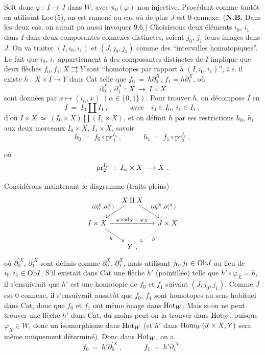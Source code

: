 Soit donc $\varphi\ :\ I\longrightarrow J$ dans $W$, avec $\pi_0(\varphi)$ non injective. Procédant comme tantôt en utilisant Loc\,(5), on est ramené au cas où de plus $J$ est $0$-connexe. (\textbf{N.B.} Dans les deux cas, on aurait pu aussi invoquer 9.6.) Choisissons deux éléments $i_0$, $i_1$ dans $I$ dans deux composantes connexes distinctes, soient $j_0$, $j_1$ leurs images dans $J$. On va traiter $(I,i_0,i_1)$ et $(J,j_0,j_1)$ comme des “intervalles homotopiques”. Le fait que $i_0$, $i_1$ appartiennent à des composantes distinctes de $I$ implique que deux flèches $f_0,f_1 : X\rightrightarrows Y$ sont “homotopes par rapport à $(I,i_0,i_1)$”, \textit{i.e.} il existe $h\ :\ X\times I\longrightarrow Y$ dans Cat telle que $f_0\ =\ h\partial_0^X$, $f_1=h\partial_1^X$, où
\[
\partial_0^X\ ,\ \partial_1^X\ :\ X\ \longrightarrow\ I\times X
\]
sont données par $x\longmapsto(i_\alpha,x)$ $(\alpha\in\{0,1\})$. Pour trouver $h$, on décompose $I$ en
\[
I\ =\ I_0\amalg I_1\ ,\qquad\quad \text{avec}\quad i_0\in I_0,\ i_1\in I_1\ ,
\]
d'où $I\times X\ \simeq\ (I_0\times X)\amalg(I_1\times X)$, et on définit $h$ par ses restrictions $h_0$, $h_1$ aux deux morceaux $I_0\times X$, $I_1\times X$, savoir
\[
h_0\ =\ f_0\circ\mathrm{pr}_2^{I_0}\ ,\qquad\quad h_1\ =\ f_1\circ\mathrm{pr}_2^{I_1}\ ,
\]

où
\[
\mathrm{pr}_2^{I_\alpha}\ :\ I_\alpha\times X \longrightarrow X\ .
\]

Considérons maintenant le diagramme (traits pleins)
\[
\begin{tikzcd}[column sep=small]
& X\amalg X \arrow[dl, "{(\partial_0^X,\partial_1^X)}"'] \arrow[dr, "{(\partial_0^{\prime X},\partial_1^{\prime X})}"] & \\
I\times X \arrow[rr, "\varphi\times\id_X\,=\,\varphi_X"] \arrow[dr, "h"'] & & J\times X \arrow[dl, dotted, "h'"] \\
& Y\ , &
\end{tikzcd}
\]
où $\partial_0^{\prime X}$, $\partial_1^{\prime X}$ sont définis comme $\partial_0^X$, $\partial_1^X$, mais utilisant $j_0,j_1\in\mathrm{Ob} J$ au lieu de $i_0,i_1\in\mathrm{Ob} I$. S'il existait dans Cat une flèche $h'$ (pointillée) telle que $h'\circ\varphi_X=h$, il s'ensuivrait que $h'$ est une homotopie de $f_0$ et $f_1$ suivant $(J,j_0,j_1)$. Comme $J$ est 0-connexe, il s'ensuivrait aussitôt que $f_0$, $f_1$ sont homotopes au sens habituel dans Cat, donc que $f_0$ et $f_1$ ont même image dans $\mathrm{Hot}_W$. Mais si on ne peut trouver une flèche $h'$ dans Cat, du moins peut-on la trouver dans $\mathrm{Hot}_W$, puisque $\varphi_X\in W$, donc un isomorphisme dans $\mathrm{Hot}_W$ (et $h'$ dans $\mathrm{Hom}_W(J\times X,Y)$ sera même uniquement déterminé). Donc dans $\mathrm{Hot}_W$, on a
\[
f_0\ =\ h'\partial_0^{\prime X}\ ,\qquad\quad f_1\ =\ h'\partial_1^{\prime X}\ .
\]

